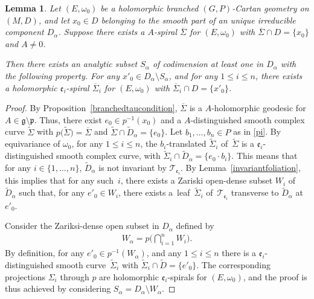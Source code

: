 \documentclass[pdftex]{sigma}
\numberwithin{equation}{section}
\newtheorem{Lemma}[Theorem]{Lemma}
\begin{document}
\begin{Lemma}\label{lemmageodesicaffine} Let $(E,\omega_0)$ be a holomorphic branched $(G,P)$-Cartan geometry on $(M,D)$, and let $x_0 \in D$ belonging to the smooth part of an unique irreducible component $D_\alpha$. Suppose there exists a $A$-spiral $\overline{\Sigma}$ for $(E,\omega_0)$ with $\overline{\Sigma}\cap D=\{x_0\}$ and $A\neq 0$.

Then there exists an analytic subset $S_\alpha$ of codimension at least one in $D_\alpha$ with the following property. For any $x'_0 \in D_\alpha \setminus S_\alpha$, and for any $1\leq i\leq n$, there exists a holomorphic $\mathfrak{e}_i$-spiral $\overline{\Sigma}_i$ for $(E,\omega_0)$ with $\overline{\Sigma}_i \cap D =\{x'_0\}$.
\end{Lemma}

\begin{proof} By Proposition~\ref{branchedtaucondition}, $\overline{\Sigma}$ is a $A$-holomorphic geodesic for $A\in \mathfrak{g}\setminus \mathfrak{p}$. Thus, there exist $e_0 \in p^{-1}(x_0)$ and a $A$-distinguished smooth complex curve $\tilde{\Sigma}$ with $p\big(\tilde{\Sigma}\big)=\overline{\Sigma}$ and $\tilde{\Sigma} \cap \tilde{D}_\alpha =\{e_0\}$. Let $b_1,\dots,b_n \in P$ as in \eqref{pi}. By equivariance of $\omega_0$, for any $1\leq i \leq n$, the $b_i$-translated $\tilde{\Sigma}_i$ of~$\tilde{\Sigma}$ is a $\mathfrak{e}_i$-distinguished smooth complex curve, with $\tilde{\Sigma}_i \cap \tilde{D}_\alpha = \{e_0 \cdot b_i\}$. This means that for any $i\in \{1,\dots,n\}$, $\tilde{D}_\alpha$ is not invariant by $\mathcal{T}_{\mathfrak{e}_i}$. By Lemma~\ref{invariantfoliation}, this implies that for any such~$i$, there exists a Zariski open-dense subset $W_i$ of $\tilde{D}_\alpha$ such that, for any $e'_0 \in W_i$, there exists a~leaf~$\tilde{\Sigma}_i$ of~$\mathcal{T}_{\mathfrak{e}_i}$ transverse to $\tilde{D}_\alpha$ at $e'_0$.

Consider the Zariksi-dense open subset in $D_\alpha$ defined by
 \begin{gather*} W_\alpha= p\bigg(\bigcap_{i=1}^{n} W_i\bigg). \end{gather*}
 By definition, for any $e'_0 \in p^{-1}(W_\alpha)$, and any $1\leq i \leq n$ there is a $\mathfrak{e}_i$-distinguished smooth curve~$\tilde{\Sigma}_i$ with $\tilde{\Sigma}_i \cap \tilde{D}=\{e'_0\}$. The corresponding projections $\Sigma_i$ through $p$ are holomorphic $\mathfrak{e}_i$-spirals for $(E,\omega_0)$, and the proof is thus achieved by considering $S_\alpha=D_\alpha\setminus W_\alpha$.
\end{proof}
\end{document}
